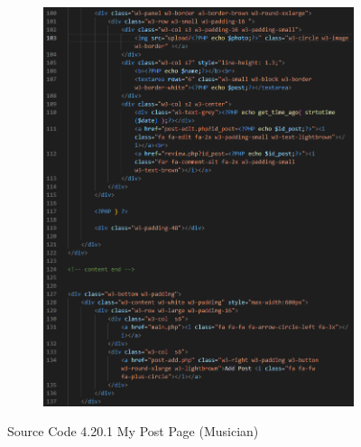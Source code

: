 \begin{enumerate}[1.]
\begin{figure}[h]
\begin{subfigure}[b]{0.8\textwidth}
            \label{fig:sub1}
        \end{subfigure}
        \hspace{0.04\textwidth}
        \begin{subfigure}[b]{0.7\textwidth}
            \centering
            \includegraphics[width=\textwidth]{mainmatter/images/frontend/code/mpost2.png}
            \label{fig:sub2}
        \end{subfigure}
        \caption*{Source Code 4.20.1 My Post Page (Musician)}
        \label{fig:myfig59a}
    \end{figure}
    \clearpage


\end{enumerate}
